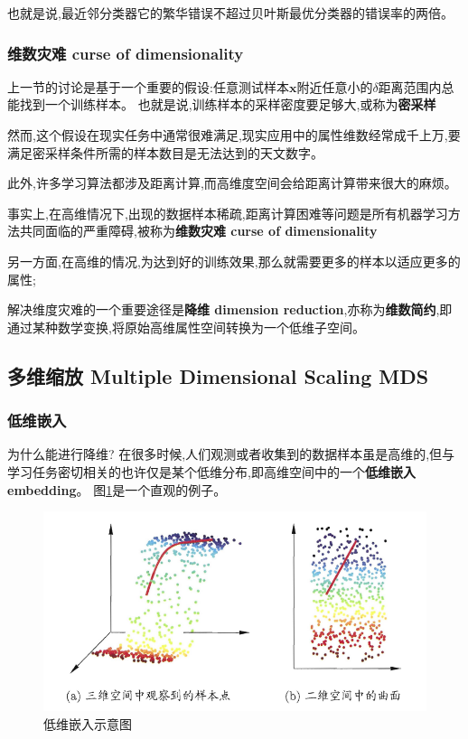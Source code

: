 \documentclass[UTF8,a4paper]{ctexart}%
\begin{document}
              {\color{red}{贝叶斯最优分类器需要去看}}

              也就是说,最近邻分类器它的繁华错误不超过贝叶斯最优分类器的错误率的两倍。

          \subsubsection{维数灾难 curse of dimensionality}
              上一节的讨论是基于一个重要的假设:任意测试样本$\mathbf{x}$附近任意小的$\delta$距离范围内总能找到一个训练样本。
              也就是说,训练样本的采样密度要足够大,或称为\textbf{密采样}

              然而,这个假设在现实任务中通常很难满足,现实应用中的属性维数经常成千上万,要满足密采样条件所需的样本数目是无法达到的天文数字。

              此外,许多学习算法都涉及距离计算,而高维度空间会给距离计算带来很大的麻烦。

              事实上,在高维情况下,出现的数据样本稀疏,距离计算困难等问题是所有机器学习方法共同面临的严重障碍,被称为\textbf{维数灾难 curse of dimensionality}

              {\color{blue}
                  另一方面,在高维的情况,为达到好的训练效果,那么就需要更多的样本以适应更多的属性;
              }

              解决维度灾难的一个重要途径是\textbf{降维 dimension reduction},亦称为\textbf{维数简约},即通过某种数学变换,将原始高维属性空间转换为一个低维子空间。

      \subsection{多维缩放 Multiple Dimensional Scaling MDS}
          \subsubsection{低维嵌入}
              为什么能进行降维?
              在很多时候,人们观测或者收集到的数据样本虽是高维的,但与学习任务密切相关的也许仅是某个低维分布,即高维空间中的一个\textbf{低维嵌入 embedding}。 图\ref{figembedding}是一个直观的例子。

              \begin{figure}[htbp]
                \centering
                \includegraphics[scale=0.5]{assets/jiqixuexi3_9102e.png}
                \caption{低维嵌入示意图}
                \label{figembedding}
              \end{figure}
\end{document}
